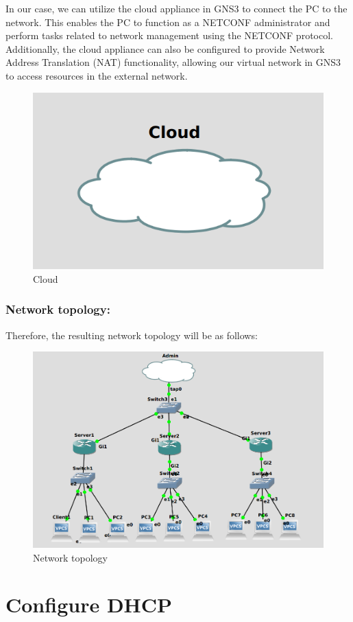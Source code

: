 In our case, we can utilize the cloud appliance in GNS3 to connect the PC to the network. This enables the PC to function as a NETCONF administrator and perform tasks related to network management using the NETCONF protocol. Additionally, the cloud appliance can also be configured to provide Network Address Translation (NAT) functionality, allowing our virtual network in GNS3 to access resources in the external network.

\begin{figure}[h]
    \centering
    \includegraphics[width=0.5\linewidth]{Images/cloud.png}
    \caption{Cloud}
    \label{fig:example}
\end{figure}

\subsubsection{Network topology:}

Therefore, the resulting network topology will be as follows:


\begin{figure}[h]
    \centering
    \includegraphics[width=\linewidth]{Images/network.png}
    \caption{Network topology}
    \label{fig:example}
\end{figure}
\section{Configure DHCP}
